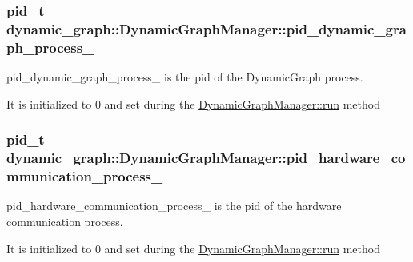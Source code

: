 \subsubsection[{\texorpdfstring{pid\+\_\+dynamic\+\_\+graph\+\_\+process\+\_\+}{pid_dynamic_graph_process_}}]{\setlength{\rightskip}{0pt plus 5cm}pid\+\_\+t dynamic\+\_\+graph\+::\+Dynamic\+Graph\+Manager\+::pid\+\_\+dynamic\+\_\+graph\+\_\+process\+\_\+\hspace{0.3cm}{\ttfamily [protected]}}\hypertarget{classdynamic__graph_1_1DynamicGraphManager_aa8aa645099e7e9cce426381e38b5027d}{}\label{classdynamic__graph_1_1DynamicGraphManager_aa8aa645099e7e9cce426381e38b5027d}


pid\+\_\+dynamic\+\_\+graph\+\_\+process\+\_\+ is the pid of the Dynamic\+Graph process. 

It is initialized to 0 and set during the \hyperlink{classdynamic__graph_1_1DynamicGraphManager_a93272fcbb3793dfc92422186022ecf72}{Dynamic\+Graph\+Manager\+::run} method 
\subsubsection[{\texorpdfstring{pid\+\_\+hardware\+\_\+communication\+\_\+process\+\_\+}{pid_hardware_communication_process_}}]{\setlength{\rightskip}{0pt plus 5cm}pid\+\_\+t dynamic\+\_\+graph\+::\+Dynamic\+Graph\+Manager\+::pid\+\_\+hardware\+\_\+communication\+\_\+process\+\_\+\hspace{0.3cm}{\ttfamily [protected]}}\hypertarget{classdynamic__graph_1_1DynamicGraphManager_a02232cdc5cabca34d07dada6ced38532}{}\label{classdynamic__graph_1_1DynamicGraphManager_a02232cdc5cabca34d07dada6ced38532}


pid\+\_\+hardware\+\_\+communication\+\_\+process\+\_\+ is the pid of the hardware communication process. 

It is initialized to 0 and set during the \hyperlink{classdynamic__graph_1_1DynamicGraphManager_a93272fcbb3793dfc92422186022ecf72}{Dynamic\+Graph\+Manager\+::run} method 
